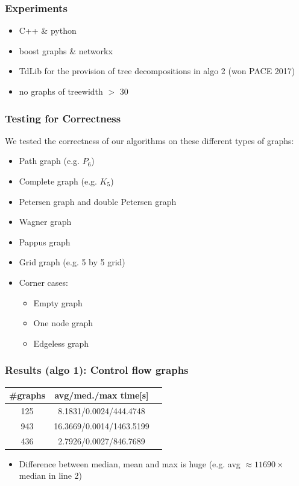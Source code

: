 \documentclass[11pt]{beamer}
\begin{document}
\begin{frame}
\frametitle{Experiments}

\begin{itemize}
\item C++ \& python
\item boost graphs \& networkx
\item TdLib for the provision of tree decompositions in algo 2 (won PACE 2017)
\item no graphs of treewidth $>$ 30
\end{itemize}
\end{frame}
\begin{frame}
\frametitle{Testing for Correctness}
We tested the correctness of our algorithms on these different types of graphs:
\begin{itemize}
	\item Path graph (e.g. $P_6$)
	\item Complete graph (e.g. $K_5$)
	\item Petersen graph and double Petersen graph
	\item Wagner graph
	\item Pappus graph
	\item Grid graph (e.g. 5 by 5 grid)
	\item Corner cases:
	\begin{itemize}
		\item Empty graph
		\item One node graph
		\item Edgeless graph
	\end{itemize}
\end{itemize}
\end{frame}
\begin{frame}
\frametitle{Results (algo 1): Control flow graphs}

\begin{center}
\footnotesize
\begin{table}[h!]
\centering
\begin{tabular}{|c|c|c|}
\hline
\#graphs & avg/med./max time[s] \\
\hline \hline
125 & 8.1831/0.0024/444.4748 \\
\hline
943 & 16.3669/0.0014/1463.5199 \\
\hline
436 & 2.7926/0.0027/846.7689 \\
\hline
\end{tabular}
\end{table}
\end{center}

\begin{itemize}
\item Difference between median, mean and max is huge (e.g. avg $\approx 11690\times$median in line 2)
\end{itemize}

\end{frame}
\end{document}

